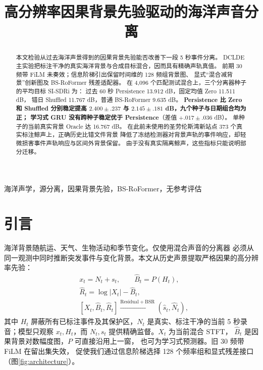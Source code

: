 \documentclass[conference]{IEEEtran}
\title{高分辨率因果背景先验驱动的海洋声音分离}
\author{\IEEEauthorblockN{匿名作者}\IEEEauthorblockA{匿名单位}}
\begin{document}
\maketitle

\begin{abstract}
本文检验从过去海洋声景得到的因果背景先验能否改善下一段 5 秒事件分离。
DCLDE 主实验把标注干净的真实海洋背景与合成目标混合，因而具有精确声轨真值。
前期 30 频带 FiLM 未奏效；信息阶梯引出保留时间维的 128 频组背景图、
显式“混合减背景”创新图及 BS-RoFormer 残差适配器。
在 4,096 个匹配测试混合上，三个分离器种子的平均目标 SI-SDRi 为：
过去 60 秒 Persistence 13.912 dB，固定均值 Zero 11.511 dB，
错日 Shuffled 11.767 dB，普通 BS-RoFormer 9.635 dB。
\textbf{Persistence 比 Zero 和 Shuffled 分别稳定提高
$2.400\pm.237$ 与 $2.145\pm.181$ dB，九个种子与日期组合均为正；
学习式 GRU 没有跨种子稳定优于 Persistence}（差值 $+.017\pm.036$ dB）。
单种子的当前真实背景 Oracle 达 16.767 dB。
在此前未使用的圣劳伦斯湾新站点 373 个真实标注鲸声上，正确历史比错文件背景
降低了冻结检测器对背景声轨的事件响应，却轻微损害事件声轨响应与区间外背景保留。
由于没有真实隔离鲸声，这些指标只能说明部分迁移。
\end{abstract}

\begin{IEEEkeywords}
海洋声学，源分离，因果背景先验，BS-RoFormer，无参考评估
\end{IEEEkeywords}

\section{引言}
海洋背景随航运、天气、生物活动和季节变化\cite{miksisolds2013indian}。仅使用混合声音的分离器
必须从同一观测中同时推断突发事件与变化背景。本文从历史声景提取严格因果的高分辨率先验：
\begin{equation}
\begin{aligned}
 &x_t=N_t+s_t,\qquad \widehat B_t=P(H_t),\\
 &\widehat R_t=\log|X_t|-\widehat B_t,\\
 &[X_t,\widehat B_t,\widehat R_t]
 \xrightarrow{\mathrm{Residual+BSR}}(\hat s_t,\hat N_t),
\end{aligned}
\end{equation}
其中 $H_t$ 屏蔽所有已标注事件及其保护区，$N_t$ 是真实、标注干净的当前 5 秒录音；模型只观察
$x_t,H_t$，而 $N_t,s_t$ 提供精确监督。$X_t$ 为当前混合 STFT，
$\widehat B_t$ 是因果背景对数幅度图，$P$ 可直接沿用上一窗，
也可为学习式预测器。旧 30 频带 FiLM 在留出集失效，
促使我们通过信息阶梯选择 128 个频率组和显式残差接口（图\ref{fig:architecture}）。
\end{document}
